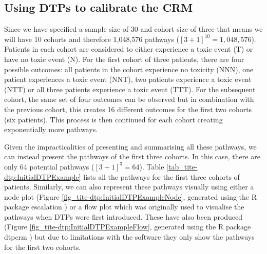 \subsection{Using DTPs to calibrate the CRM}
\label{tite-dtp:UsingDTPs-Calibration}

Since we have specified a sample size of 30 and cohort size of three that means we will have 10 cohorts and therefore 1,048,576 pathways ($[3+1]^{10} = 1,048,576$). Patients in each cohort are considered to either experience a toxic event (T) or have no toxic event (N). For the first cohort of three patients, there are four possible outcomes: all patients in the cohort experience no toxicity (NNN), one patient experiences a toxic event (NNT), two patients experience a toxic event (NTT) or all three patients experience a toxic event (TTT). For the subsequent cohort, the same set of four outcomes can be observed but in combination with the previous cohort, this creates 16 different outcomes for the first two cohorts (six patients). This process is then continued for each cohort creating exponentially more pathways. 

Given the impracticalities of presenting and summarising all these pathways, we can instead present the pathways of the first three cohorts. In this case, there are only 64 potential pathways ($[3+1]^{3} = 64$). Table \ref{tab_tite-dtp:InitialDTPExample} lists all the pathways for the first three cohorts of patients. Similarly, we can also represent these pathways visually using either a node plot (Figure \ref{fig_tite-dtp:InitialDTPExampleNode}, generated using the R package escalation \cite{brockModularApproachDose2020}) or a flow plot which was originally used to visualise the pathways when DTPs were first introduced. These have also been produced (Figure \ref{fig_tite-dtp:InitialDTPExampleFlow}, generated using the R package dtpcrm \cite{yapDtpcrmDoseTransition2019}) but due to limitations with the software they only show the pathways for the first two cohorts. 

